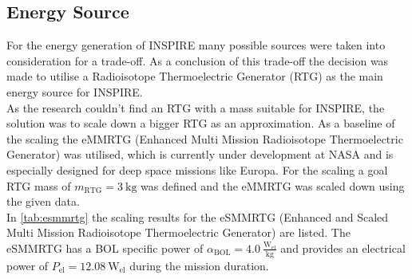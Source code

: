 \subsection{Energy Source}
For the energy generation of INSPIRE many possible sources were taken into consideration for a trade-off. As a conclusion of this trade-off the decision was made to utilise a Radioisotope Thermoelectric Generator (RTG) as the main energy source for INSPIRE.\\
As the research couldn't find an RTG with a mass suitable for INSPIRE, the solution was to scale down a bigger RTG as an approximation. As a baseline of the scaling the eMMRTG (Enhanced Multi Mission Radioisotope Thermoelectric Generator) was utilised, which is currently under development at NASA and is especially designed for deep space missions like Europa. For the scaling a goal RTG mass of $m_\text{RTG}=3~\text{kg}$ was defined and the eMMRTG was scaled down using the given data.\\
In \autoref{tab:esmmrtg} the scaling results for the eSMMRTG (Enhanced and Scaled Multi Mission Radioisotope Thermoelectric Generator) are listed. The eSMMRTG has a BOL specific power of $\alpha_\text{BOL}= 4.0 \ \frac{\text{W}_\text{el}}{\text{kg}}$ and provides an electrical power of $P_\text{el} = 12.08~\text{W}_\text{el}$ during the mission duration\cite{R.Abelsonetal..2004}\cite{S.Magdum.2019}\cite{Holgate.2015}\cite{eMMRTG.NASA}\cite{Lakdawalla.2018}.




%

